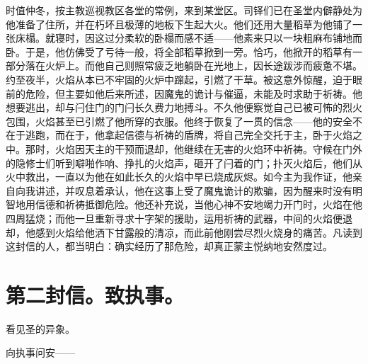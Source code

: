 时值仲冬，按主教巡视教区各堂的常例，来到某堂区。司铎们已在圣堂内僻静处为他准备了住所，并在朽坏且极薄的地板下生起大火。他们还用大量稻草为他铺了一张床榻。就寝时，因这过分柔软的卧榻而感不适——他素来只以一块粗麻布铺地而卧。于是，他仿佛受了亏待一般，将全部稻草掀到一旁。恰巧，他掀开的稻草有一部分落在火炉上。而他自己则照常疲乏地躺卧在光地上，因长途跋涉而疲惫不堪。约至夜半，火焰从本已不牢固的火炉中蹿起，引燃了干草。被这意外惊醒，迫于眼前的危险，但主要如他后来所述，因魔鬼的诡计与催逼，未能及时求助于祈祷。他想要逃出，却与闩住门的门闩长久费力地搏斗。不久他便察觉自己已被可怖的烈火包围，火焰甚至已引燃了他所穿的衣服。他终于恢复了一贯的信念——他的安全不在于逃跑，而在于，他拿起信德与祈祷的盾牌，将自己完全交托于主，卧于火焰之中。那时，火焰因天主的干预而退却，他继续在无害的火焰环中祈祷。守候在门外的隐修士们听到噼啪作响、挣扎的火焰声，砸开了闩着的门；扑灭火焰后，他们从火中救出，一直以为他在如此长久的火焰中早已烧成灰烬。如今主为我作证，他亲自向我讲述，并叹息着承认，他在这事上受了魔鬼诡计的欺骗，因为醒来时没有明智地用信德和祈祷抵御危险。他还补充说，当他心神不安地竭力开门时，火焰在他四周猛烧；而他一旦重新寻求十字架的援助，运用祈祷的武器，中间的火焰便退却，他感到火焰给他洒下甘露般的清凉，而此前他刚尝尽烈火烧身的痛苦。凡读到这封信的人，都当明白：确实经历了那危险，却真正蒙主悦纳地安然度过。\par


\section{第二封信。致执事。}

看见圣的异象。\par

向执事问安——\par

